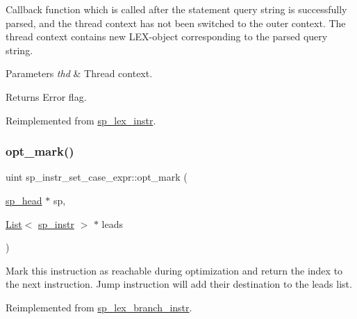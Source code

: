 Callback function which is called after the statement query string is successfully parsed, and the thread context has not been switched to the outer context. The thread context contains new L\+EX-\/object corresponding to the parsed query string.


\begin{DoxyParams}{Parameters}
{\em thd} & Thread context.\\
\hline
\end{DoxyParams}
\begin{DoxyReturn}{Returns}
Error flag. 
\end{DoxyReturn}


Reimplemented from \mbox{\hyperlink{classsp__lex__instr_adcace7d5b7daeb393d0592592a2d9d6c}{sp\+\_\+lex\+\_\+instr}}.

\mbox{\label{classsp__instr__set__case__expr_a40890fccd0dca44d11d61dcb0a88b043}} 
\subsubsection{\texorpdfstring{opt\+\_\+mark()}{opt\_mark()}}
{\footnotesize\ttfamily uint sp\+\_\+instr\+\_\+set\+\_\+case\+\_\+expr\+::opt\+\_\+mark (\begin{DoxyParamCaption}\item[{\mbox{\hyperlink{classsp__head}{sp\+\_\+head}} $\ast$}]{sp,  }\item[{\mbox{\hyperlink{classList}{List}}$<$ \mbox{\hyperlink{classsp__instr}{sp\+\_\+instr}} $>$ $\ast$}]{leads }\end{DoxyParamCaption})\hspace{0.3cm}{\ttfamily [virtual]}}

Mark this instruction as reachable during optimization and return the index to the next instruction. Jump instruction will add their destination to the leads list. 

Reimplemented from \mbox{\hyperlink{classsp__lex__branch__instr_a07500581e51283aad3b04602a7b87c74}{sp\+\_\+lex\+\_\+branch\+\_\+instr}}.

\mbox{\label{classsp__instr__set__case__expr_abc03926238c4442d32e3bfb4d89fcac1}} 
